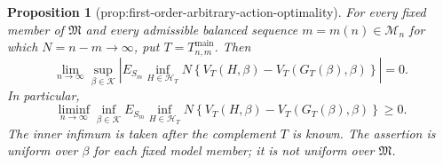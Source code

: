 \documentclass{article}
\newtheorem{proposition}{Proposition}
\begin{document}
\begin{proposition}[prop:first-order-arbitrary-action-optimality]\label{prop:first-order-arbitrary-action-optimality}
For every fixed member of \(\mathfrak M\) and every admissible balanced sequence \(m=m(n)\in\mathcal M_n\) for which \(N=n-m\to\infty\), put \(T=T_{n,m}^{\mathrm{main}}\).  Then
\[
\lim_{n\to\infty}\sup_{\beta\in\mathcal K}
\left|
E_{S_m}\inf_{H\in\mathcal H_T}
N\left\{V_T(H,\beta)-V_T(G_T(\beta),\beta)\right\}
\right|=0.
\]
In particular,
\[
\liminf_{n\to\infty}\inf_{\beta\in\mathcal K}
E_{S_m}\inf_{H\in\mathcal H_T}
N\left\{V_T(H,\beta)-V_T(G_T(\beta),\beta)\right\}
\geq0.
\]
The inner infimum is taken after the complement \(T\) is known.  The assertion is uniform over \(\beta\) for each fixed model member; it is not uniform over \(\mathfrak M\).
\end{proposition}
\end{document}
